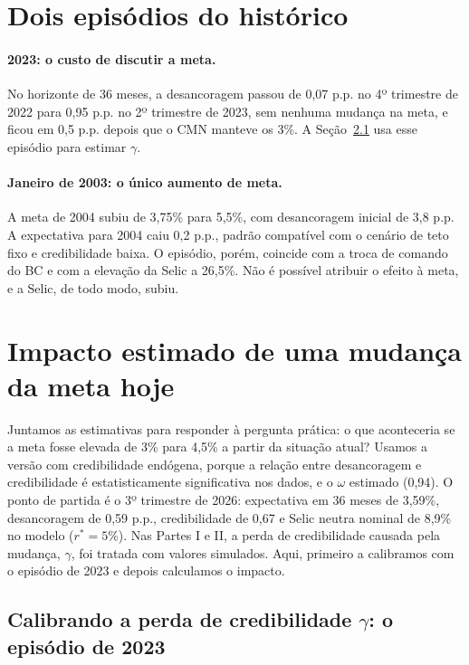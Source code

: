 \documentclass[11pt,a4paper]{article}
\begin{document}
\section{Dois episódios do histórico}

\paragraph{2023: o custo de discutir a meta.} No horizonte de 36 meses, a desancoragem passou de 0,07 p.p. no 4º trimestre de 2022 para 0,95 p.p. no 2º trimestre de 2023, sem nenhuma mudança na meta, e ficou em 0,5 p.p. depois que o CMN manteve os 3\%. A Seção~\ref{sec:gamma} usa esse episódio para estimar $\gamma$.

\paragraph{Janeiro de 2003: o único aumento de meta.} A meta de 2004 subiu de 3,75\% para 5,5\%, com desancoragem inicial de 3,8 p.p. A expectativa para 2004 caiu 0,2 p.p., padrão compatível com o cenário de teto fixo e credibilidade baixa. O episódio, porém, coincide com a troca de comando do BC e com a elevação da Selic a 26,5\%. Não é possível atribuir o efeito à meta, e a Selic, de todo modo, subiu.

\section{Impacto estimado de uma mudança da meta hoje}

Juntamos as estimativas para responder à pergunta prática: o que aconteceria se a meta fosse elevada de 3\% para 4,5\% a partir da situação atual? Usamos a versão com credibilidade endógena, porque a relação entre desancoragem e credibilidade é estatisticamente significativa nos dados, e o $\omega$ estimado (0,94). O ponto de partida é o 3º trimestre de 2026: expectativa em 36 meses de 3,59\%, desancoragem de 0,59 p.p., credibilidade de 0,67 e Selic neutra nominal de 8,9\% no modelo ($r^{*}=5\%$). Nas Partes I e II, a perda de credibilidade causada pela mudança, $\gamma$, foi tratada com valores simulados. Aqui, primeiro a calibramos com o episódio de 2023 e depois calculamos o impacto.


\subsection{Calibrando a perda de credibilidade $\gamma$: o episódio de 2023}
\label{sec:gamma}
\end{document}
